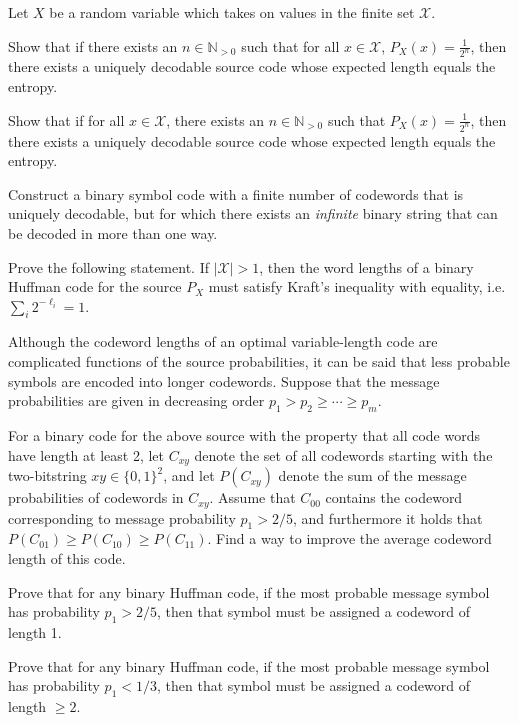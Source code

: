 \documentclass[a4paper,10pt,landscape,twocolumn]{scrartcl}
\begin{document}
\begin{exercise}
Let $X$ be a random variable which takes on values in the finite set $\mathcal{X}$.
	\begin{subex}
	Show that if there exists an $n \in \mathbb{N}_{>0}$ such that for
        all $x \in \mathcal{X}$, $P_X(x) = \frac{1}{2^n}$, then there
        exists a uniquely decodable source code whose expected length equals the entropy.
	\end{subex}
	\begin{subex}
        Show that if for all $x \in \mathcal{X}$, there exists an $n \in \mathbb{N}_{>0}$ such that $P_X(x) = \frac{1}{2^n}$, then there exists a uniquely decodable source code whose expected length equals the entropy.
	\end{subex}
\end{exercise}

\begin{bonusexercise}
Construct a binary symbol code with a finite number of codewords that is uniquely decodable, but for which there exists an \emph{infinite} binary string that can be decoded in more than one way.
\end{bonusexercise}

\begin{exercise}
Prove the following statement. 
If $|\mathcal{X}| >1$, then the word lengths of a binary Huffman code for the source $P_X$ must satisfy Kraft's inequality with equality, i.e. $\sum_i 2^{-\ell_i} = 1$.
\end{exercise}


\begin{exercise}
Although the codeword lengths of an optimal variable-length code are complicated functions of the source probabilities, it can be said that less probable symbols are encoded into longer codewords. Suppose that the message probabilities are given in decreasing order $p_1 > p_2 \geq \cdots \geq p_m$.
\begin{subex}
For a binary code for the above source with the property that all code words have length at least 2, let $C_{xy}$ denote the set of all codewords starting with the two-bitstring $xy \in \{0,1\}^2$, and let $P(C_{xy})$ denote the sum of the message probabilities of codewords in $C_{xy}$. Assume that $C_{00}$ contains the codeword corresponding to message probability $p_1 > 2/5$, and furthermore it holds that $P(C_{01}) \geq P(C_{10}) \geq P(C_{11})$. Find a way to improve the average codeword length of this code.
\end{subex}
\begin{subex}
	Prove that for any binary Huffman code, if the most probable message symbol has probability $p_1 > 2/5$, then that symbol must be assigned a codeword of length 1.
\end{subex}
\begin{subex}
	Prove that for any binary Huffman code, if the most probable message symbol has probability $p_1 < 1/3$, then that symbol must be assigned a codeword of length $\geq 2$.
\end{subex}
\end{exercise}
\end{document}
